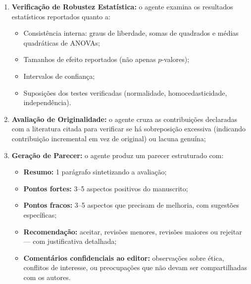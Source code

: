 \begin{enumerate}
    \item \textbf{Verificação de Robustez Estatística:} o agente
    examina os resultados estatísticos reportados quanto a:

    \begin{itemize}
        \item Consistência interna: graus de liberdade, somas de
        quadrados e médias quadráticas de ANOVAs;

        \item Tamanhos de efeito reportados (não apenas
        $p$-valores);

        \item Intervalos de confiança;

        \item Suposições dos testes verificadas (normalidade,
        homocedasticidade, independência).
    \end{itemize}

    \item \textbf{Avaliação de Originalidade:} o agente cruza as
    contribuições declaradas com a literatura citada para verificar
    se há sobreposição excessiva (indicando contribuição
    incremental em vez de original) ou lacuna genuína;

    \item \textbf{Geração de Parecer:} o agente produz um parecer
    estruturado com:

    \begin{itemize}
        \item \textbf{Resumo:} 1 parágrafo sintetizando a avaliação;

        \item \textbf{Pontos fortes:} 3--5 aspectos positivos do
        manuscrito;

        \item \textbf{Pontos fracos:} 3--5 aspectos que precisam de
        melhoria, com sugestões específicas;

        \item \textbf{Recomendação:} aceitar, revisões menores,
        revisões maiores ou rejeitar — com justificativa detalhada;

        \item \textbf{Comentários confidenciais ao editor:}
        observações sobre ética, conflitos de interesse, ou
        preocupações que não devam ser compartilhadas com os
        autores.
    \end{itemize}
\end{enumerate}

